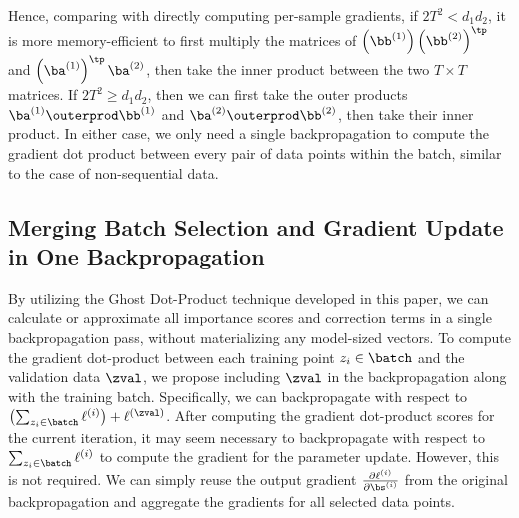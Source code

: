 Hence, comparing with directly computing per-sample gradients, if $2T^2 < d_1 d_2$, it is more memory-efficient to first multiply the matrices of $\left(\bb^{(1)}\right) \left(\bb^{(2)}\right)^{\tp}$ and $\left( \ba^{(1)} \right)^\tp \ba^{(2)}$, then take the inner product between the two $T \times T$ matrices. If $2 T^2 \ge d_1 d_2$, then we can first take the outer products $\ba^{(1)} \outerprod \bb^{(1)}$ and $\ba^{(2)} \outerprod \bb^{(2)}$, then take their inner product. In either case, we only need a single backpropagation to compute the gradient dot product between every pair of data points within the batch, similar to the case of non-sequential data. 

\subsection{Merging Batch Selection and Gradient Update in One Backpropagation}
\label{appendix:efficiency-bookkeeping}

By utilizing the Ghost Dot-Product technique developed in this paper, we can calculate or approximate all importance scores and correction terms in a single backpropagation pass, without materializing any model-sized vectors. To compute the gradient dot-product between each training point \(z_i \in \batch\) and the validation data \(\zval\), we propose including \(\zval\) in the backpropagation along with the training batch. Specifically, we can backpropagate with respect to $\left(\sum_{z_i \in \batch} \ell^{(i)}\right) + \ell^{(\zval)}$. 
After computing the gradient dot-product scores for the current iteration, it may seem necessary to backpropagate with respect to \(\sum_{z_i \in \batch} \ell^{(i)}\) to compute the gradient for the parameter update. However, this is not required. We can simply reuse the output gradient \(\frac{\partial \ell^{(i)}}{\partial \bs^{(i)}}\) from the original backpropagation and aggregate the gradients for all selected data points.